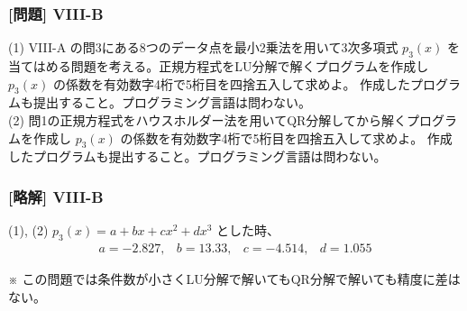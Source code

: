 \documentclass[dvipdfmx,aspectratio=169,20pt]{beamer}
\newcommand{\myfontsetting}[3]{{\fontsize{#1}{#2}\selectfont #3}}
\begin{document}
\graphicspath{{figs/}}

\begin{frame}
\frametitle{[問題] V\hspace{-.1em}I\hspace{-.1em}I\hspace{-.1em}I-B}
\myfontsetting{15pt}{20pt}{
(1) {V\hspace{-.1em}I\hspace{-.1em}I\hspace{-.1em}I-A} の問3にある8つのデータ点を最小2乗法を用いて3次多項式 $p_3(x)$ を当てはめる問題を考える。正規方程式をLU分解で解くプログラムを作成し $p_3(x)$ の係数を有効数字4桁で5桁目を四捨五入して求めよ。
作成したプログラムも提出すること。プログラミング言語は問わない。\\
(2) 問1の正規方程式をハウスホルダー法を用いてQR分解してから解くプログラムを作成し $p_3(x)$ の係数を有効数字4桁で5桁目を四捨五入して求めよ。
作成したプログラムも提出すること。プログラミング言語は問わない。
}
\end{frame}
\begin{frame}
\frametitle{[略解] V\hspace{-.1em}I\hspace{-.1em}I\hspace{-.1em}I-B}
\myfontsetting{18pt}{18pt}{
(1), (2)
$p_3(x)=a + b x + c x^2 + dx^3$ とした時、
\[
\begin{matrix}
a = -2.827, & b =  13.33, &c = -4.514, & d = 1.055
\end{matrix}
\]
}

\vspace{10mm}

\myfontsetting{10pt}{10pt}{
※ この問題では条件数が小さくLU分解で解いてもQR分解で解いても精度に差はない。
}
\end{frame}
\end{document}
